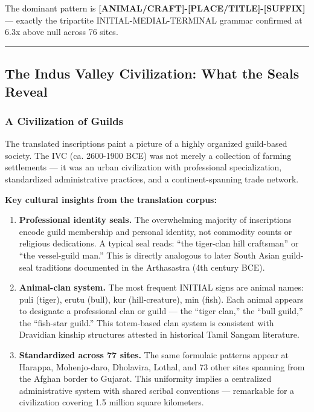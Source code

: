 \documentclass[
  11pt,
]{article}
\begin{document}
The dominant pattern is
\textbf{{[}ANIMAL/CRAFT{]}-{[}PLACE/TITLE{]}-{[}SUFFIX{]}} --- exactly
the tripartite INITIAL-MEDIAL-TERMINAL grammar confirmed at 6.3x above
null across 76 sites.

\begin{center}\rule{0.5\linewidth}{0.5pt}\end{center}

\subsection{The Indus Valley Civilization: What the Seals
Reveal}\label{the-indus-valley-civilization-what-the-seals-reveal}

\subsubsection{A Civilization of Guilds}\label{a-civilization-of-guilds}

The translated inscriptions paint a picture of a highly organized
guild-based society. The IVC (ca. 2600-1900 BCE) was not merely a
collection of farming settlements --- it was an urban civilization with
professional specialization, standardized administrative practices, and
a continent-spanning trade network.

\textbf{Key cultural insights from the translation corpus:}

\begin{enumerate}
\def\labelenumi{\arabic{enumi}.}
\item
  \textbf{Professional identity seals.} The overwhelming majority of
  inscriptions encode guild membership and personal identity, not
  commodity counts or religious dedications. A typical seal reads: ``the
  tiger-clan hill craftsman'' or ``the vessel-guild man.'' This is
  directly analogous to later South Asian guild-seal traditions
  documented in the Arthasastra (4th century BCE).
\item
  \textbf{Animal-clan system.} The most frequent INITIAL signs are
  animal names: puli (tiger), erutu (bull), kur (hill-creature), min
  (fish). Each animal appears to designate a professional clan or guild
  --- the ``tiger clan,'' the ``bull guild,'' the ``fish-star guild.''
  This totem-based clan system is consistent with Dravidian kinship
  structures attested in historical Tamil Sangam literature.
\item
  \textbf{Standardized across 77 sites.} The same formulaic patterns
  appear at Harappa, Mohenjo-daro, Dholavira, Lothal, and 73 other sites
  spanning from the Afghan border to Gujarat. This uniformity implies a
  centralized administrative system with shared scribal conventions ---
  remarkable for a civilization covering 1.5 million square kilometers.
\end{enumerate}
\end{document}
